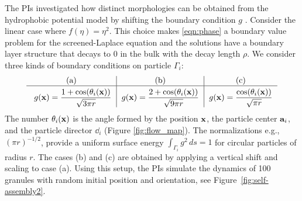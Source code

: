 The PIs investigated how 
distinct morphologies can be obtained from 
the hydrophobic potential model by shifting the boundary condition $g$ \cite{fu-ryh-qua-you2022}.
Consider the linear case where $f(\eta) = \eta^2$.
This choice makes \eqref{eqn:phase} a boundary value
problem for the screened-Laplace equation
and the solutions have a boundary layer structure that decays to $0$ in the
bulk with the decay length $\rho$.
We consider three kinds of boundary conditions
on particle $\Gamma_i$:
\begin{equation}
  \label{eq:bcs}
  \begin{tabular}{c|c|c}
     \text{(a)} & \text{(b)} & \text{(c)} \\
    \hline
    \rule{0pt}{4ex} 
      $g(\mathbf{x}) = \displaystyle \frac{1+\cos (\theta_i(\xx))}{\sqrt{3\pi r}}$
    & $g(\mathbf{x}) = \displaystyle \frac{2+\cos (\theta_i(\xx))}{\sqrt{9\pi r}}$
    & $g(\mathbf{x}) = \displaystyle \frac{\cos (\theta_i(\xx))}{\sqrt{\pi r}}$
\end{tabular}
\end{equation}
The number $\theta_i(\xx)$ is the angle formed by the position $\xx$, the
particle center $\aa_i$, and the particle director $\dd_i$ (Figure \ref{fig:flow_map}).
The normalizations e.g., $(\pi r)^{-1/2}$, provide a uniform
surface energy $\int_{\Gamma_i} g^2 \,ds = 1$ for circular particles
of radius $r$. 
The cases (b) and (c) are obtained by applying a vertical shift
and scaling to case (a).
Using this setup, the PIs simulate the dynamics of 100 granules with random
initial position and orientation, see Figure~\ref{fig:self-assembly2}.

